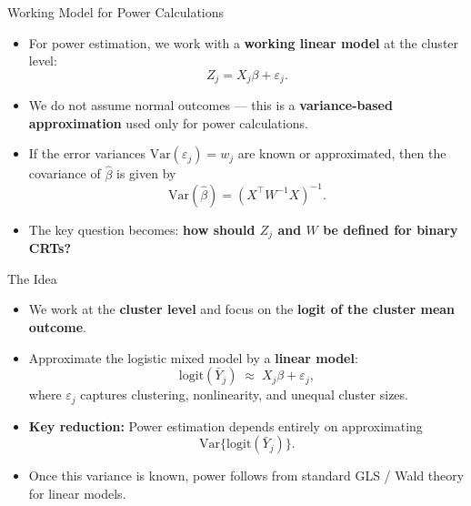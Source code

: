 \documentclass[aspectratio=169]{beamer} %
\begin{document}
\begin{frame}{Working Model for Power Calculations}

\begin{itemize}
  \item For power estimation, we work with a
        \textbf{working linear model} at the cluster level:
    \[
      Z_j = X_j \beta + \varepsilon_j.
    \]

  \item We do not assume normal outcomes —
        this is a \textbf{variance-based approximation}
        used only for power calculations.

  \item If the error variances
        $\mathrm{Var}(\varepsilon_j) = w_j$ are known or approximated,
        then the covariance of $\hat\beta$ is given by
    \[
      \mathrm{Var}(\hat\beta)
      = (X^\top W^{-1} X)^{-1}.
    \]

  \item The key question becomes:
        \textbf{how should $Z_j$ and $W$ be defined for binary CRTs?}
\end{itemize}

\end{frame}

\begin{frame}{The Idea}

\begin{itemize}
  \item We work at the \textbf{cluster level} and focus on the
        \textbf{logit of the cluster mean outcome}.

  \item Approximate the logistic mixed model by a
        \textbf{linear model}:
    \[
      \text{logit}(\bar Y_j)
      \;\approx\;
      X_j \beta + \varepsilon_j,
    \]
    where $\varepsilon_j$ captures clustering, nonlinearity,
    and unequal cluster sizes.

  \item \textbf{Key reduction:}
        Power estimation depends entirely on approximating
        \[
          \mathrm{Var}\{\text{logit}(\bar Y_j)\}.
        \]

  \item Once this variance is known, power follows from
        standard GLS / Wald theory for linear models.
\end{itemize}

\end{frame}
\end{document}
